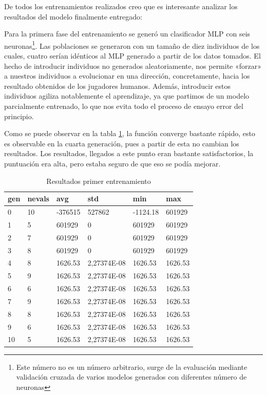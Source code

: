 De todos los entrenamientos realizados creo que es interesante analizar los resultados del modelo finalmente entregado:



Para la primera fase del entrenamiento se generó un clasificador MLP con seis neuronas\footnote{Este número no es un número arbitrario, surge de la evaluación mediante validación cruzada de varios modelos generados con diferentes número de neuronas}. Las poblaciones se generaron con un tamaño de diez individuos de los cuales, cuatro serían idénticos al MLP generado a partir de los datos tomados. El hecho de introducir individuos no generados aleatoriamente, nos permite «forzar» a nuestros individuos a evolucionar en una  dirección, concretamente, hacia los resultado obtenidos de los jugadores humanos. Además, introducir estos individuos agiliza notablemente el aprendizaje, ya que partimos de un modelo parcialmente entrenado, lo que nos evita todo el proceso de ensayo error del principio.

Como se puede observar en la tabla \ref{result_primer_entr}, la función converge bastante rápido, esto es observable en la cuarta generación, pues a partir de esta no cambian los resultados. Los resultados, llegados a este punto eran bastante satisfactorios, la puntuación era alta, pero estaba seguro de que eso se podía mejorar.


\begin{table}[]
\centering
\begin{tabular}{|l|l|l|l|l|l|}
\hline
\rowcolor[HTML]{C0C0C0} 
gen & nevals & avg     & std         & min      & max     \\ \hline
0   & 10     & -376515 & 527862      & -1124.18 & 601929  \\ \hline
1   & 5      & 601929  & 0           & 601929   & 601929  \\ \hline
2   & 7      & 601929  & 0           & 601929   & 601929  \\ \hline
3   & 8      & 601929  & 0           & 601929   & 601929  \\ \hline
4   & 8      & 1626.53 & 2,27374E-08 & 1626.53  & 1626.53 \\ \hline
5   & 9      & 1626.53 & 2,27374E-08 & 1626.53  & 1626.53 \\ \hline
6   & 6      & 1626.53 & 2,27374E-08 & 1626.53  & 1626.53 \\ \hline
7   & 9      & 1626.53 & 2,27374E-08 & 1626.53  & 1626.53 \\ \hline
8   & 8      & 1626.53 & 2,27374E-08 & 1626.53  & 1626.53 \\ \hline
9   & 6      & 1626.53 & 2,27374E-08 & 1626.53  & 1626.53 \\ \hline
10  & 5      & 1626.53 & 2,27374E-08 & 1626.53  & 1626.53 \\ \hline
\end{tabular}
\caption{Resultados primer entrenamiento}
\label{result_primer_entr}
\end{table}



